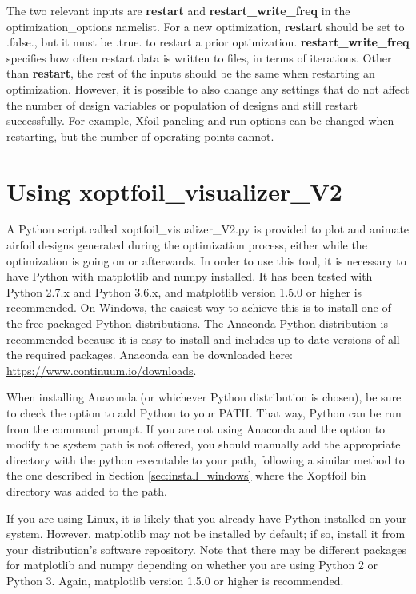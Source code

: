 \documentclass[11pt]{article}
\begin{document}
The two relevant inputs are \textbf{restart} and \textbf{restart\_write\_freq} in the
optimization\_options namelist.  For a new optimization, \textbf{restart} should be set to
.false., but it must be .true. to restart a prior optimization.
\textbf{restart\_write\_freq} specifies how often restart data is written to files, in
terms of iterations.  Other than \textbf{restart}, the rest of the inputs should be the
same when restarting an optimization.  However, it is possible to also change any settings
that do not affect the number of design variables or population of designs and still
restart successfully.  For example, Xfoil paneling and run options can be changed when
restarting, but the number of operating points cannot. 

\section{Using xoptfoil\_visualizer\_V2}\label{sec:xoptfoil_visualizer_V2}

A Python script called xoptfoil\_visualizer\_V2.py is provided to plot and animate airfoil
designs generated during the optimization process, either while the optimization is going
on or afterwards.  In order to use this tool, it is
necessary to have Python with matplotlib and numpy installed. It has been tested with
Python 2.7.x and Python 3.6.x, and matplotlib version 1.5.0 or higher is recommended.
On Windows, the easiest
way to achieve this is to install one of the free packaged Python distributions.  The
Anaconda Python distribution is recommended because it is easy to install and includes
up-to-date versions of all the required packages.  Anaconda can be downloaded here:
\url{https://www.continuum.io/downloads}.

When installing Anaconda (or whichever Python distribution is chosen), be sure to check
the option to add Python to your PATH.  That way, Python can be run from the
command prompt.  If you are not using Anaconda and the option to modify the system path is
not offered, you should manually add the appropriate directory with the python executable
to your path, following a similar method to the one described in Section
\ref{sec:install_windows} where the Xoptfoil bin directory was added to the path.

If you are using Linux, it is likely that you already have Python installed on your
system.  However, matplotlib may not be installed by default; if so, install it from your
distribution's software repository.  Note that there may be different packages for 
matplotlib
and numpy depending on whether you are using Python 2 or Python 3. Again, matplotlib
version 1.5.0 or higher is recommended.
\end{document}
